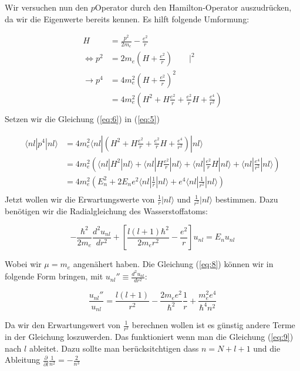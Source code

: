 Wir versuchen nun den \(p\)Operator durch den Hamilton-Operator auszudrücken, da wir die Eigenwerte bereits kennen. Es hilft folgende Umformung:


\begin{align}
  \label{eq:6}
  H &= \frac{p^2}{2m_e}-\frac{e^2}{r} \\
\Leftrightarrow p^2 &= 2m_e\left( H + \frac{e^2}{r} \right) \qquad |^2\\
\rightarrow p^4 &= 4m_e^2\left( H + \frac{e^2}{r} \right)^2\\
&= 4m_e^2\left( H^2 + H \frac{e^2}{r}+ \frac{e^2}{r}H +\frac{e^4}{r^2}  \right)\\
\end{align}
Setzen wir die Gleichung (\ref{eq:6}) in (\ref{eq:5})

\begin{align}
  \label{eq:7}
  \langle nl|p^4|nl\rangle &= 4m_e^2 \langle nl|\left( H^2 + H \frac{e^2}{r}+ \frac{e^2}{r}H +\frac{e^4}{r^2}\right) |nl\rangle \\
 &= 4m_e^2 \left(  \langle nl| H^2|nl\rangle + \langle nl| H \frac{e^2}{r}|nl\rangle+ \langle nl| \frac{e^2}{r}H|nl\rangle + \langle nl|\frac{e^4}{r^2}|nl\rangle\right)  \\
 &= 4m_e^2 \left( E_n^2 + 2E_ne^2\langle nl| \frac{1}{r}|nl\rangle + e^4\langle nl|\frac{1}{r^2}|nl\rangle\right)  \\
\end{align}
Jetzt wollen wir die Erwartungswerte von \(\frac{1}{r}|nl\rangle\) und \(\frac{1}{r^2}|nl\rangle\) bestimmen. Dazu benötigen wir die Radialgleichung des Wasserstoffatoms:

\begin{equation}
  \label{eq:8}
  -\frac{\hbar^2}{2m_e}\frac{d^2u_{nl}}{dr^2} + \left[\frac{l(l+1)\hbar^2}{2m_e r^2}-\frac{e^2}{r}\right]u_{nl} = E_n u_{nl}
\end{equation}


Wobei wir \(\mu=m_e\) angenähert haben. Die Gleichung (\ref{eq:8}) können wir in folgende Form bringen, mit \(u_{nl}'' \equiv\frac{d^2u_{nl}}{dr^2} \):

\begin{equation}
  \label{eq:9}
  \frac{u_{nl}''}{u_{nl}} = \frac{l(l+1)}{r^2} - \frac{2m_e e^2}{\hbar^2}\frac{1}{r}+\frac{m_e^2e^4}{\hbar^4 n^2}
\end{equation}


Da wir den Erwartungswert von \(\frac{1}{r^2}\) berechnen wollen ist es günstig andere Terme in der Gleichung loszuwerden. Das funktioniert wenn man die Gleichung (\ref{eq:9}) nach \(l\) ableitet. Dazu sollte man berücksitchtigen dass \(n=N+l+1\) und die Ableitung \(\frac{\partial}{\partial l}\frac{1}{n^2} = -\frac{2}{n^3} \)

